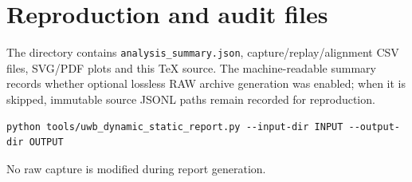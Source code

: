 \documentclass[10pt,a4paper]{article}
\begin{document}
\section{Reproduction and audit files}
The directory contains \texttt{analysis\_summary.json}, capture/replay/alignment
CSV files, SVG/PDF plots and this TeX source. The machine-readable summary
records whether optional lossless RAW archive generation was enabled; when it
is skipped, immutable source JSONL paths remain recorded for reproduction.

\begin{verbatim}
python tools/uwb_dynamic_static_report.py --input-dir INPUT --output-dir OUTPUT
\end{verbatim}

No raw capture is modified during report generation.
\end{document}
